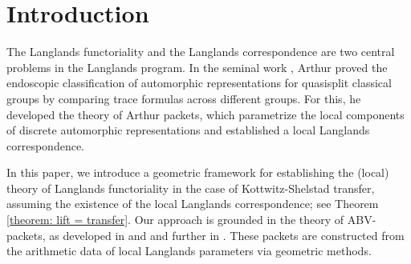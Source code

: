 \documentclass[11pt,letterpaper]{amsart}
\numberwithin{equation}{section}
\begin{document}
\begin{abstract}
We give a geometric analogue of Kottwitz-Shelstad transfer for a general class of reductive groups over $p$-adic fields with cyclic component groups of trivial or prime order. We prove that this geometric transfer coincides with Kottwitz-Shelstad transfer, adapted to the language of disconnected groups, assuming the local Langlands correspondence satisfying certain desiderata, including the Kazhdan-Lusztig hypothesis for the ambient group and its endoscopic groups. As an application of this geometrization, we prove Vogan's conjecture on local Arthur packets over {\it p}-adic fields: for quasisplit classical groups and their pure inner forms, all local Arthur packets are ABV-packets, and the distributions attached to these ABV-packets of Arthur type satisfy Arthur's local conjectures on twisted endoscopic character relations. This demonstrates the following general principle: {\it for any reductive group $G$ over a local field, an Arthur packet should be defined as an ABV-packet of Arthur type, equipped with the endoscopic pairing calculated by traces of actions on vanishing cycles or microlocalizations}. 
\end{abstract}


\maketitle
                     
\setcounter{section}{0}


\section{Introduction}\label{section: introduction}


The Langlands functoriality and the Langlands correspondence are two central problems in the Langlands program. In the seminal work \cite{Art13}, Arthur proved the endoscopic classification of automorphic representations for quasisplit classical groups by comparing trace formulas across different groups. For this, he developed the theory of Arthur packets, which parametrize the local components of discrete automorphic representations and established a local Langlands correspondence. 

In this paper, we introduce a geometric framework for establishing the (local) theory of Langlands functoriality in the case of Kottwitz-Shelstad transfer, assuming the existence of the local Langlands correspondence; see Theorem \ref{theorem: lift = transfer}. 
Our approach is grounded in the theory of ABV-packets, as developed in  
\cites{ABV92,Vog93} and \cite{CFMMX22} and further in 
\cites{Mracek,CFZ2,CFK22,Lo24,CR1,CDFZ25,CR2}. 
These packets are constructed from the arithmetic data of local 
Langlands parameters via geometric methods. 
\end{document}
